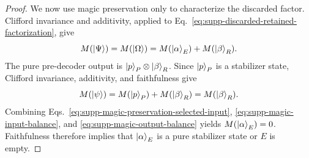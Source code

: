 \documentclass[
  aps,
  prx,
  reprint,
  superscriptaddress,
  amsmath,
  amssymb,
  nofootinbib,
  longbibliography
]{revtex4-2}
\newcommand{\QZ}[1]{{{\textcolor{blue}{#1}}}}
\begin{document}
\begin{proof}


We now use magic preservation only to characterize the discarded factor.
Clifford invariance and additivity, applied to
Eq.~\eqref{eq:supp-discarded-retained-factorization}, give
\begin{equation}
M(\ket{\Psi})
=M(\ket{\Omega})
=M(\ket{\alpha}_E)+M(\ket{\beta}_R).
\label{eq:supp-magic-input-balance}
\end{equation}
The pure pre-decoder output is
$\ket{p}_P\otimes\ket{\beta}_R$.  Since $\ket{p}_P$ is a stabilizer state,
Clifford invariance, additivity, and faithfulness give
\begin{equation}
M(\ket{\psi})
=M(\ket{p}_P)+M(\ket{\beta}_R)
=M(\ket{\beta}_R).
\label{eq:supp-magic-output-balance}
\end{equation}
Combining Eqs.~\eqref{eq:supp-magic-preservation-selected-input},
\eqref{eq:supp-magic-input-balance}, and
\eqref{eq:supp-magic-output-balance} yields
$M(\ket{\alpha}_E)=0$.  Faithfulness therefore implies that
$\ket{\alpha}_E$ is a pure stabilizer state or $E$ is empty.


\end{proof}
\end{document}
